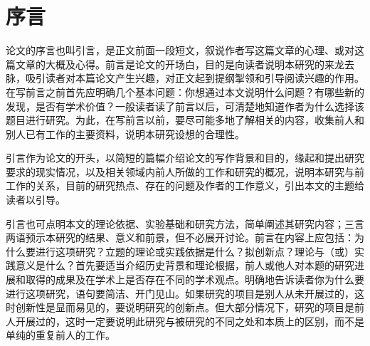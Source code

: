 
\chapter{序言}

论文的序言也叫引言，是正文前面一段短文，叙说作者写这篇文章的心理、或对这篇文章的大概及心得。前言是论文的开场白，目的是向读者说明本研究的来龙去脉，吸引读者对本篇论文产生兴趣，对正文起到提纲掣领和引导阅读兴趣的作用。在写前言之前首先应明确几个基本问题：你想通过本文说明什么问题？有哪些新的发现，是否有学术价值？一般读者读了前言以后，可清楚地知道作者为什么选择该题目进行研究。为此，在写前言以前，要尽可能多地了解相关的内容，收集前人和别人已有工作的主要资料，说明本研究设想的合理性。

引言作为论文的开头，以简短的篇幅介绍论文的写作背景和目的，缘起和提出研究要求的现实情况，以及相关领域内前人所做的工作和研究的概况，说明本研究与前工作的关系，目前的研究热点、存在的问题及作者的工作意义，引出本文的主题给读者以引导。

引言也可点明本文的理论依据、实验基础和研究方法，简单阐述其研究内容；三言两语预示本研究的结果、意义和前景，但不必展开讨论。前言在内容上应包括：为什么要进行这项研究？立题的理论或实践依据是什么？拟创新点？理论与（或）实践意义是什么？首先要适当介绍历史背景和理论根据，前人或他人对本题的研究进展和取得的成果及在学术上是否存在不同的学术观点。明确地告诉读者你为什么要进行这项研究，语句要简洁、开门见山。如果研究的项目是别人从未开展过的，这时创新性是显而易见的，要说明研究的创新点。但大部分情况下，研究的项目是前人开展过的，这时一定要说明此研究与被研究的不同之处和本质上的区别，而不是单纯的重复前人的工作。




